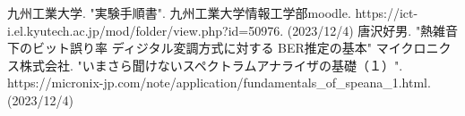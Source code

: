 \documentclass[dvipdfmx]{jsarticle}
\begin{document}
\begin{thebibliography}{9}
   九州工業大学. "実験手順書". 九州工業大学情報工学部moodle. https://ict-i.el.kyutech.ac.jp/mod/folder/view.php?id=50976. (2023/12/4)
  \bibitem{} 唐沢好男. "熱雑音下のビット誤り率 ディジタル変調方式に対する BER推定の基本"
  \bibitem{} マイクロニクス株式会社. "いまさら聞けないスペクトラムアナライザの基礎（１）". https://micronix-jp.com/note/application/fundamentals\_of\_speana\_1.html. (2023/12/4)
\end{thebibliography}
\end{document}
